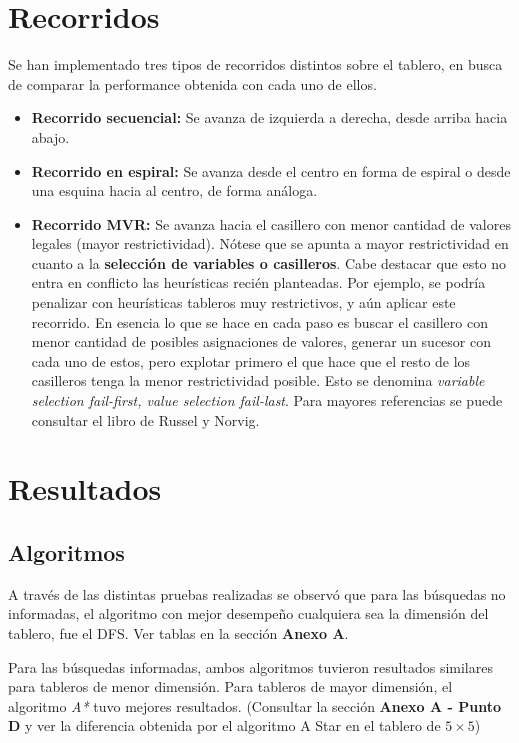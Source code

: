 \documentclass[%
    final,
    reprint,
    notitlepage,
    narroweqnarray,
    inline,
    twoside,
    invited
    ]{ieee}
\begin{document}
\section{Recorridos}

\par Se han implementado tres tipos de recorridos distintos sobre el tablero, en busca de comparar la performance obtenida con cada uno de ellos.\\

\begin{itemize}
\item \textbf{Recorrido secuencial: } Se avanza de izquierda a derecha, desde arriba hacia abajo.
\item \textbf{Recorrido en espiral: } Se avanza desde el centro en forma de espiral o desde una esquina hacia al centro, de forma análoga.
\item \textbf{Recorrido MVR: } Se avanza hacia el casillero con menor cantidad de valores legales (mayor restrictividad). Nótese que se apunta 
a mayor restrictividad en cuanto a la \textbf{selección de variables o casilleros}. Cabe destacar que esto no 
entra en conflicto las heurísticas recién planteadas. Por ejemplo, se podría penalizar con heurísticas tableros muy restrictivos, y aún aplicar este 
recorrido. En esencia lo que se hace en cada paso es buscar el casillero con menor cantidad de posibles asignaciones de valores, generar un sucesor 
con cada uno de estos, pero explotar primero el que hace que el resto de los casilleros tenga la menor restrictividad posible. Esto se denomina 
\textit{ variable selection fail-first, value selection fail-last}. Para mayores referencias se puede consultar el libro de Russel y Norvig.
\end{itemize}

\section{Resultados}

\subsection{Algoritmos}

\par A través de las distintas pruebas realizadas se observó que para las búsquedas no informadas, el algoritmo con mejor desempeño cualquiera 
sea la dimensión del tablero, fue el DFS. Ver tablas en la sección \textbf{Anexo A}. 
\par Para las búsquedas informadas, ambos algoritmos tuvieron resultados similares para tableros de menor dimensión. Para tableros de mayor dimensión, 
el algoritmo \textit{A*} tuvo mejores resultados. (Consultar la sección \textbf{Anexo A - Punto D} y ver la diferencia obtenida por el algoritmo A Star en el tablero de $5\times5$)
\end{document}
